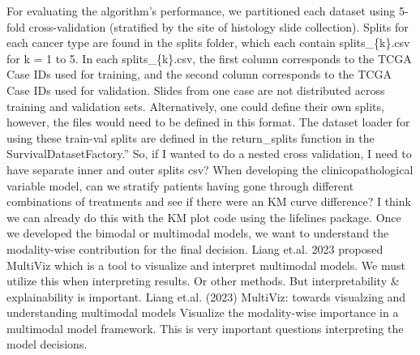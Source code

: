 \documentclass{article}%
\begin{document}
\newline%
\newline%
%
For evaluating the algorithm's performance, we partitioned each dataset using 5{-}fold cross{-}validation (stratified by the site of histology slide collection). Splits for each cancer type are found in the splits folder, which each contain splits\_\{k\}.csv for k = 1 to 5. In each splits\_\{k\}.csv, the first column corresponds to the TCGA Case IDs used for training, and the second column corresponds to the TCGA Case IDs used for validation. Slides from one case are not distributed across training and validation sets. Alternatively, one could define their own splits, however, the files would need to be defined in this format. The dataset loader for using these train{-}val splits are defined in the return\_splits function in the SurvivalDatasetFactory.”%
\newline%
\newline%
%
So, if I wanted to do a nested cross validation, I need to have separate inner and outer splits csv? %
\newline%
\newline%
%
When developing the clinicopathological variable model, can we stratify patients having gone through different combinations of treatments and see if there were an KM curve difference? %
\newline%
\newline%
%
I think we can already do this with the KM plot code using the lifelines package. %
\newline%
\newline%
%
Once we developed the bimodal or multimodal models, we want to understand the modality{-}wise contribution for the final decision. Liang et.al. 2023 proposed MultiViz which is a tool to visualize and interpret multimodal models. We must utilize this when interpreting results. Or other methods. But interpretability \& explainability is important. %
\newline%
\newline%
%
Liang et.al. (2023) MultiViz: towards visualzing and understanding multimodal models%
\newline%
\newline%
%
Visualize the modality{-}wise importance in a multimodal model framework.%
\newline%
\newline%
%
This is very important questions interpreting the model decisions.%
\newline%
\newline%
\end{document}
